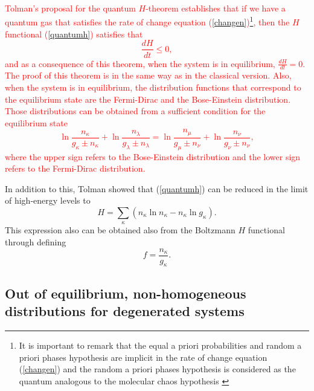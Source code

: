 \textcolor{red}{Tolman's proposal for the quantum $H$-theorem establishes that
if we have a quantum gas that satisfies the rate of change equation
(\ref{changen})\footnote{It is important to remark that the equal a priori
probabilities and random a priori phases hypothesis are implicit in the rate of
change equation (\ref{changen}) and the random a priori phases hypothesis is
considered as the quantum analogous to the molecular chaos hypothesis
\cite{bib:das2018}}, then the $H$ functional (\ref{quantumh}) satisfies that
%
\begin{equation}
    \frac{dH}{dt}\leq 0,
\end{equation}
%
and as a consequence of this theorem, when the system is in equilibrium,
$\frac{dH}{dt}=0$.\\
The proof of this theorem is in the same way as in the classical version. Also,
when the system is in equilibrium, the distribution functions that correspond
to the equilibrium state are the Fermi-Dirac and the Bose-Einstein
distribution. Those distributions can be obtained from a sufficient condition
for the equilibrium state
%
\begin{equation}
    \ln \frac{n_{\kappa}}{g_{\kappa}\pm n_{\kappa}}+\ln \frac{n_{\lambda}}{g_{\lambda}\pm n_{\lambda}}=\ln \frac{n_{\mu}}{g_{\mu}\pm n_{\nu}}+\ln \frac{n_{\nu}}{g_{\nu}\pm n_{\nu}},
\end{equation}
%
where the upper sign refers to the Bose-Einstein distribution and the lower
sign refers to the Fermi-Dirac distribution.}

In addition to this, Tolman showed that (\ref{quantumh}) can be reduced in the
limit of high-energy levels to
%
\begin{equation}
    H = \sum_{\kappa} (n_{\kappa} \ln n_{\kappa} - n_{\kappa} \ln g_{\kappa}). \label{reduce-h}
\end{equation}
%
This expression also can be obtained also from the Boltzmann $H$ functional through defining
%
\begin{equation}
    f=\frac{n_{\kappa}}{ g_{\kappa}}.
\end{equation}
%

\subsection{Out of equilibrium, non-homogeneous distributions for degenerated systems}

